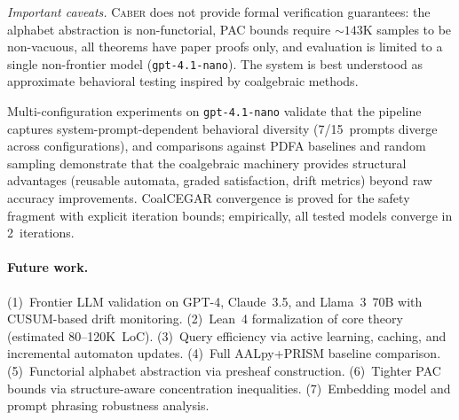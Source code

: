 \documentclass[11pt]{article}
\newcommand{\tool}{\textsc{Caber}}
\begin{document}
\emph{Important caveats.}
\tool{} does not provide formal verification guarantees:
the alphabet abstraction is non-functorial, PAC bounds require
${\sim}143$K samples to be non-vacuous, all theorems have paper proofs
only, and evaluation is limited to a single non-frontier model
(\texttt{gpt-4.1-nano}).  The system is best understood as
approximate behavioral testing inspired by coalgebraic methods.

Multi-configuration experiments on \texttt{gpt-4.1-nano} validate
that the pipeline captures system-prompt-dependent behavioral diversity
(7/15~prompts diverge across configurations), and comparisons against
PDFA baselines and random sampling demonstrate that the coalgebraic
machinery provides structural advantages (reusable automata, graded
satisfaction, drift metrics) beyond raw accuracy improvements.
CoalCEGAR convergence is proved for the safety fragment with
explicit iteration bounds; empirically, all tested models converge
in 2~iterations.

\paragraph{Future work.}
(1)~Frontier LLM validation on GPT-4, Claude~3.5, and Llama~3~70B
with CUSUM-based drift monitoring.
(2)~Lean~4 formalization of core theory (estimated 80--120K~LoC).
(3)~Query efficiency via active learning, caching, and incremental
automaton updates.
(4)~Full AALpy+PRISM baseline comparison.
(5)~Functorial alphabet abstraction via presheaf construction.
(6)~Tighter PAC bounds via structure-aware concentration inequalities.
(7)~Embedding model and prompt phrasing robustness analysis.
\end{document}
